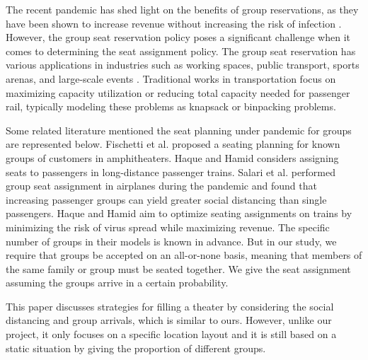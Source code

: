 The recent pandemic has shed light on the benefits of group reservations, as they have been shown to increase revenue without increasing the risk of infection \cite{moore2021seat}. However, the group seat reservation policy poses a significant challenge when it comes to determining the seat assignment policy. The group seat reservation has various applications in industries such as working spaces\cite{fischetti2021safe}, public transport\cite{deplano2019offline}, sports arenas\cite{kwag2022optimal}, and large-scale events \cite{lewis2016creating}. Traditional works \cite{clausen2010off, deplano2019offline}in transportation focus on maximizing capacity utilization or reducing total capacity needed for passenger rail, typically modeling these problems as knapsack or binpacking problems.



Some related literature mentioned the seat planning under pandemic for groups are represented below.
Fischetti et al. \cite{fischetti2021safe} proposed a seating planning for known groups of customers in amphitheaters. Haque and Hamid \cite{haque2022optimization} considers assigning seats to passengers in long-distance passenger trains. Salari et al. \cite{salari2022social} performed group seat assignment in airplanes during the pandemic and found that increasing passenger groups can yield greater social distancing than single passengers. Haque and Hamid \cite{haque2023social} aim to optimize seating assignments on trains by minimizing the risk of virus spread while maximizing revenue. The specific number of groups in their models is known in advance. But in our study, we require that groups be accepted on an all-or-none basis, meaning that members of the same family or group must be seated together. We give the seat assignment assuming the groups arrive in a certain probability.


This paper \cite{blom2022filling} discusses strategies for filling a theater by considering the social distancing and group arrivals, which is similar to ours. However, unlike our project, it only focuses on a specific location layout and it is still based on a static situation by giving the proportion of different groups.



